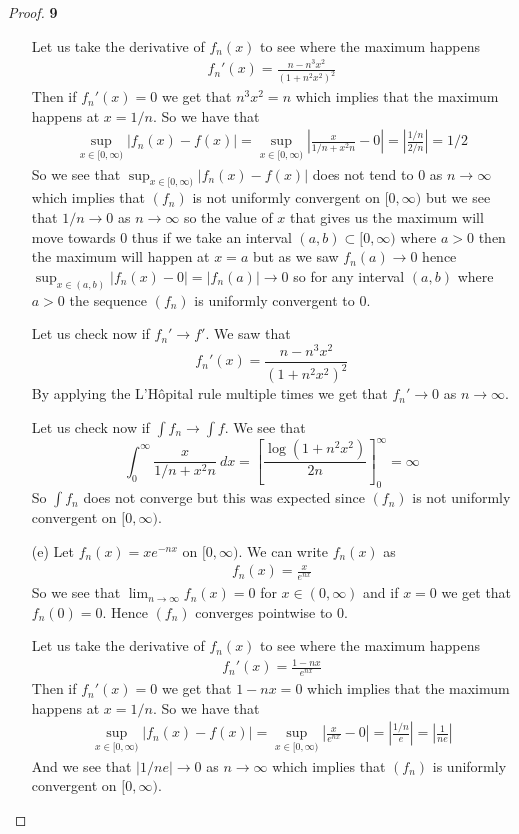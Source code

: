 \documentclass[11pt]{article}
\theoremstyle{definition}
\begin{document}
\begin{proof}{\textbf{9}}
\begin{itemize}
    Let us take the derivative of $f_n(x)$ to see where the maximum happens
    \begin{align*}
        f_n'(x) = \frac{n - n^3 x^2}{(1 + n^2 x^2)^2}
    \end{align*}
    Then if $f_n'(x) = 0$ we get that $n^3 x^2 = n$ which implies that the
    maximum happens at $x = 1/n$. So we have that
    \begin{align*}
        \sup_{x \in [0,\infty)} \left|f_n(x) - f(x)\right|
        = \sup_{x \in [0,\infty)} \left|\frac{x}{1/n + x^2n} - 0\right|
        = \left|\frac{1/n}{2/n}\right| = 1/2
    \end{align*}
    So we see that $\sup_{x \in [0,\infty)} \left|f_n(x) - f(x)\right|$ does
    not tend to $0$ as $n \to \infty$ which implies that $(f_n)$ is not
    uniformly convergent on $[0,\infty)$ but we see that $1/n \to 0$ as
    $n\to \infty$ so the value of $x$ that gives us the maximum will move
    towards $0$ thus if we take an interval $(a,b) \subset [0,\infty)$ where $a> 0$
    then the maximum will happen at $x=a$ but as we saw $f_n(a) \to 0$ hence
    $\sup_{x \in (a,b)} |f_n(x) - 0| = |f_n(a)|\to 0$ so for any interval
    $(a,b)$ where $a > 0$ the sequence $(f_n)$ is uniformly convergent to $0$.

    Let us check now if $f_n' \to f'$. We saw that
    $$f_n'(x) = \frac{n - n^3 x^2}{(1 + n^2 x^2)^2}$$
    By applying the L'Hôpital rule multiple times we get that $f_n' \to 0$
    as $n \to \infty$.

    Let us check now if $\int f_n \to \int f$. We see that
    $$\int_0^\infty \frac{x}{1/n + x^2n}~dx
    = \left[\frac{\log(1 + n^2 x^2)}{2 n}\right]_{0}^\infty = \infty $$
    So $\int f_n$ does not converge but this was expected since $(f_n)$ is not
    uniformly convergent on $[0,\infty)$. 

    \cleardoublepage
    \item [(e)] Let $f_n(x) = xe^{-nx}$ on $[0,\infty)$. We can write
    $f_n(x)$ as
    \begin{align*}
        f_n(x) = \frac{x}{e^{nx}}
    \end{align*}
    So we see that $\lim_{n \to \infty} f_n(x) = 0$ for $x \in (0,\infty)$ and
    if $x = 0$ we get that $f_n(0) = 0$. Hence $(f_n)$ converges pointwise
    to $0$.

    Let us take the derivative of $f_n(x)$ to see where the maximum happens
    \begin{align*}
        f_n'(x) = \frac{1 - nx}{e^{nx}}
    \end{align*}
    Then if $f_n'(x) = 0$ we get that $1 - nx = 0$ which implies that the
    maximum happens at $x = 1/n$. So we have that
    \begin{align*}
        \sup_{x \in [0,\infty)} \left|f_n(x) - f(x)\right|
        = \sup_{x \in [0,\infty)} \left|\frac{x}{e^{nx}} - 0\right|
        = \left|\frac{1/n}{e}\right| = \left|\frac{1}{ne}\right|
    \end{align*}
    And we see that $|1/ne| \to 0$ as $n \to \infty$ which implies
    that $(f_n)$ is uniformly convergent on $[0,\infty)$.


\end{itemize}
\end{proof}
\end{document}
